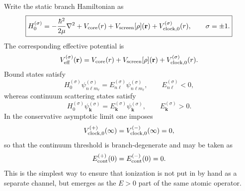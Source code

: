 \documentclass[11pt,a4paper]{article}
\begin{document}
Write the static branch Hamiltonian as
\begin{equation}
\label{eq:H0sigma}
\boxed{
H_0^{(\sigma)}
=
-\frac{\hbar^2}{2\mu}\nabla^2
+
V_{\rm core}(r)
+
V_{\rm screen}[\rho](\mathbf r)
+
V_{{\rm clock},0}^{(\sigma)}(r),
\qquad
\sigma=\pm 1.
}
\end{equation}
The corresponding effective potential is
\begin{equation}
\label{eq:Veffsigma}
V_{\rm eff}^{(\sigma)}(\mathbf r)
=
V_{\rm core}(r)
+
V_{\rm screen}[\rho](\mathbf r)
+
V_{{\rm clock},0}^{(\sigma)}(r).
\end{equation}
Bound states satisfy
\begin{equation}
\label{eq:boundstates}
H_0^{(\sigma)}\psi_{n\ell m_\ell}^{(\sigma)}
=
E_{n\ell}^{(\sigma)}\psi_{n\ell m_\ell}^{(\sigma)},
\qquad
E_{n\ell}^{(\sigma)}<0,
\end{equation}
whereas continuum scattering states satisfy
\begin{equation}
\label{eq:continuumstates}
H_0^{(\sigma)}\psi_{\mathbf k}^{(\sigma)}
=
E_{\mathbf k}^{(\sigma)}\psi_{\mathbf k}^{(\sigma)},
\qquad
E_{\mathbf k}^{(\sigma)}>0.
\end{equation}
In the conservative asymptotic limit one imposes
\begin{equation}
\label{eq:clock-asymptotic}
V_{{\rm clock},0}^{(+)}(\infty)=V_{{\rm clock},0}^{(-)}(\infty)=0,
\end{equation}
so that the continuum threshold is branch-degenerate and may be taken as
\begin{equation}
\label{eq:continuum-threshold}
E_{\rm cont}^{(+)}(0)=E_{\rm cont}^{(-)}(0)=0.
\end{equation}
This is the simplest way to ensure that ionization is not put in by hand as a separate channel, but emerges as the $E>0$ part of the same atomic operator.
\end{document}
